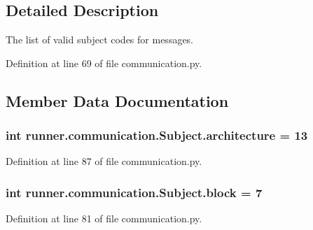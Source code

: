 \subsection{Detailed Description}
\begin{DoxyVerb}The list of valid subject codes for messages.
\end{DoxyVerb}
 

Definition at line 69 of file communication.\+py.



\subsection{Member Data Documentation}
\hypertarget{classrunner_1_1communication_1_1Subject_aea19a5c74958152ffc62b2cfb9566987}{}
\subsubsection[{architecture}]{\setlength{\rightskip}{0pt plus 5cm}int runner.\+communication.\+Subject.\+architecture = 13\hspace{0.3cm}{\ttfamily [static]}}\label{classrunner_1_1communication_1_1Subject_aea19a5c74958152ffc62b2cfb9566987}


Definition at line 87 of file communication.\+py.

\hypertarget{classrunner_1_1communication_1_1Subject_a57c8a424411628070935b985340cc7a7}{}
\subsubsection[{block}]{\setlength{\rightskip}{0pt plus 5cm}int runner.\+communication.\+Subject.\+block = 7\hspace{0.3cm}{\ttfamily [static]}}\label{classrunner_1_1communication_1_1Subject_a57c8a424411628070935b985340cc7a7}


Definition at line 81 of file communication.\+py.

\hypertarget{classrunner_1_1communication_1_1Subject_a97b4cc6e3172e21385480bcdb8715973}{}
